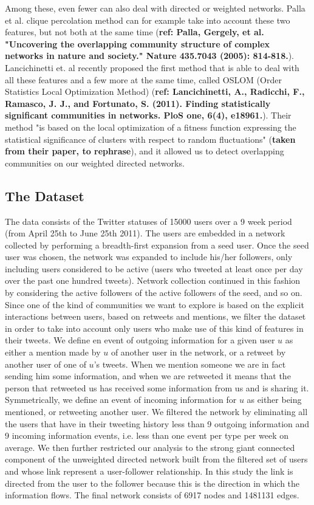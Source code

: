 Among these, even fewer can also deal with directed or weighted networks. Palla et al. clique percolation method can for example take into account these two features, but not both at the same time (\textbf{ref: Palla, Gergely, et al. "Uncovering the overlapping community structure of complex networks in nature and society." Nature 435.7043 (2005): 814-818.}). Lancichinetti et. al recently proposed the first method that is able to deal with all these features and a few more at the same time, called OSLOM (Order Statistics Local Optimization Method) (\textbf{ref: Lancichinetti, A., Radicchi, F., Ramasco, J. J., and Fortunato, S. (2011). Finding statistically significant communities in networks. PloS one, 6(4), e18961.}). Their method "is based on the local optimization of a fitness function expressing the statistical significance of clusters with respect to random fluctuations" (\textbf{taken from their paper, to rephrase}), and it allowed us to detect overlapping communities on our weighted directed networks.

\subsection{The Dataset}

The data consists of the Twitter statuses of 15000 users over a 9 week period (from April 25th to June 25th 2011). The users are embedded in a network collected by performing a breadth-first expansion from a seed user. Once the seed user was chosen, the network was expanded to include his/her followers, only including users considered to be active (users who tweeted at least once per day over the past one hundred tweets). Network collection continued in this fashion by considering the active followers of the active followers of the seed, and so on.
Since one of the kind of communities we want to explore is based on the explicit interactions between users, based on retweets and mentions, we filter the dataset in order to take into account only users who make use of this kind of features in their tweets. We define en event of outgoing information for a given user $u$ as either a mention made by $u$ of another user in the network, or a retweet by another user of one of $u$'s tweets. When we mention someone we are in fact sending him some information, and when we are retweeted it means that the person that retweeted us has received some information from us and is sharing it. Symmetrically, we define an event of incoming information for $u$ as either being mentioned, or retweeting another user. We filtered the network by eliminating all the users that have in their tweeting history less than 9 outgoing information and 9 incoming information events, i.e. less than one event per type per week on average. We then further restricted our analysis to the strong giant connected component of the unweighted directed network built from the filtered set of users and whose link represent a user-follower relationship. In this study the link is directed from the user to the follower because this is the direction in which the information flows. The final network consists of 6917 nodes and 1481131 edges.

